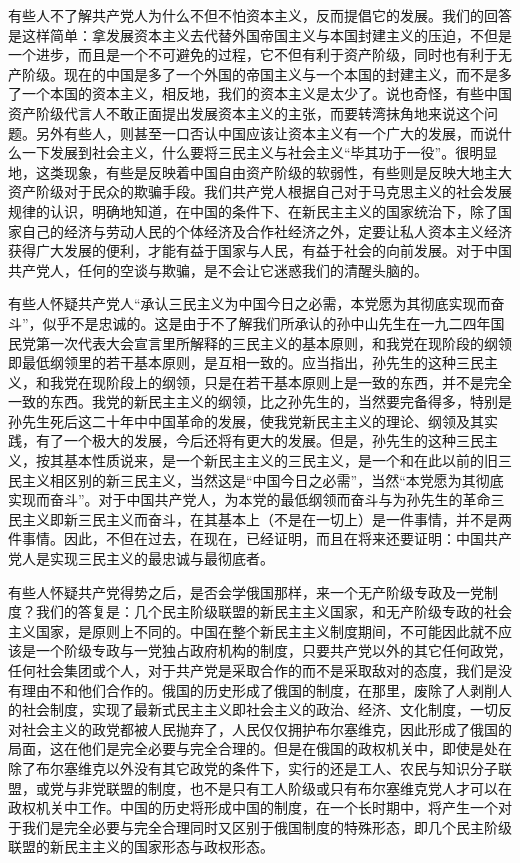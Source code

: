 有些人不了解共产党人为什么不但不怕资本主义，反而提倡它的发展。我们的回答是这样简单：拿发展资本主义去代替外国帝国主义与本国封建主义的压迫，不但是一个进步，而且是一个不可避免的过程，它不但有利于资产阶级，同时也有利于无产阶级。现在的中国是多了一个外国的帝国主义与一个本国的封建主义，而不是多了一个本国的资本主义，相反地，我们的资本主义是太少了。说也奇怪，有些中国资产阶级代言人不敢正面提出发展资本主义的主张，而要转湾抹角地来说这个问题。另外有些人，则甚至一口否认中国应该让资本主义有一个广大的发展，而说什么一下发展到社会主义，什么要将三民主义与社会主义“毕其功于一役”。很明显地，这类现象，有些是反映着中国自由资产阶级的软弱性，有些则是反映大地主大资产阶级对于民众的欺骗手段。我们共产党人根据自己对于马克思主义的社会发展规律的认识，明确地知道，在中国的条件下、在新民主主义的国家统治下，除了国家自己的经济与劳动人民的个体经济及合作社经济之外，定要让私人资本主义经济获得广大发展的便利，才能有益于国家与人民，有益于社会的向前发展。对于中国共产党人，任何的空谈与欺骗，是不会让它迷惑我们的清醒头脑的。

有些人怀疑共产党人“承认三民主义为中国今日之必需，本党愿为其彻底实现而奋斗”，似乎不是忠诚的。这是由于不了解我们所承认的孙中山先生在一九二四年国民党第一次代表大会宣言里所解释的三民主义的基本原则，和我党在现阶段的纲领即最低纲领里的若干基本原则，是互相一致的。应当指出，孙先生的这种三民主义，和我党在现阶段上的纲领，只是在若干基本原则上是一致的东西，并不是完全一致的东西。我党的新民主主义的纲领，比之孙先生的，当然要完备得多，特别是孙先生死后这二十年中中国革命的发展，使我党新民主主义的理论、纲领及其实践，有了一个极大的发展，今后还将有更大的发展。但是，孙先生的这种三民主义，按其基本性质说来，是一个新民主主义的三民主义，是一个和在此以前的旧三民主义相区别的新三民主义，当然这是“中国今日之必需”，当然“本党愿为其彻底实现而奋斗”。对于中国共产党人，为本党的最低纲领而奋斗与为孙先生的革命三民主义即新三民主义而奋斗，在其基本上（不是在一切上）是一件事情，并不是两件事情。因此，不但在过去，在现在，已经证明，而且在将来还要证明：中国共产党人是实现三民主义的最忠诚与最彻底者。

有些人怀疑共产党得势之后，是否会学俄国那样，来一个无产阶级专政及一党制度？我们的答复是：几个民主阶级联盟的新民主主义国家，和无产阶级专政的社会主义国家，是原则上不同的。中国在整个新民主主义制度期间，不可能因此就不应该是一个阶级专政与一党独占政府机构的制度，只要共产党以外的其它任何政党，任何社会集团或个人，对于共产党是采取合作的而不是采取敌对的态度，我们是没有理由不和他们合作的。俄国的历史形成了俄国的制度，在那里，废除了人剥削人的社会制度，实现了最新式民主主义即社会主义的政治、经济、文化制度，一切反对社会主义的政党都被人民抛弃了，人民仅仅拥护布尔塞维克，因此形成了俄国的局面，这在他们是完全必要与完全合理的。但是在俄国的政权机关中，即使是处在除了布尔塞维克以外没有其它政党的条件下，实行的还是工人、农民与知识分子联盟，或党与非党联盟的制度，也不是只有工人阶级或只有布尔塞维克党人才可以在政权机关中工作。中国的历史将形成中国的制度，在一个长时期中，将产生一个对于我们是完全必要与完全合理同时又区别于俄国制度的特殊形态，即几个民主阶级联盟的新民主主义的国家形态与政权形态。

